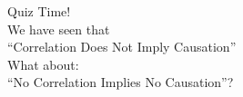 \documentclass[11pt]{beamer}
\begin{document}
  




{
\begin{frame}[standout]
    \raggedright
  Quiz Time! \\ \vspace{1cm}
  We have seen that \\
“Correlation Does  Not Imply Causation” \\
What about: \\
“No Correlation Implies No Causation”? \\



\end{frame}
}
\end{document}
